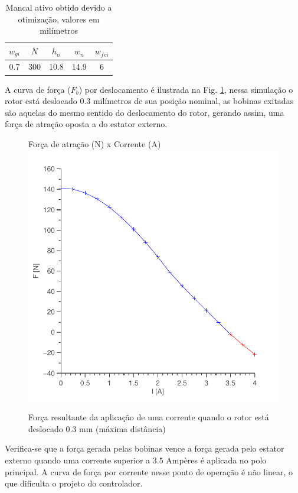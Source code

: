 \begin{table}[ht!]
	\centering
	\begin{tabular}{c c c c c}
		 $w_{gi}$ 	& $N$ & $h_n$ & $w_n$ & $w_{fei}$  \\ \hline \hline
		 0.7		& 300  	& 10.8 	& 14.9	& 6
	\end{tabular} 
	\caption{Mancal ativo obtido devido a otimização, valores em milímetros}
	\label{tab:ativo:resultado} 
\end{table}

A curva de força ($F_b$) por deslocamento é ilustrada na Fig. \ref{ativo_otimizado_fem_I_dx03}, nessa simulação o rotor está deslocado 0.3 milímetros de sua posição nominal, as bobinas exitadas são aquelas do mesmo sentido do deslocamento do rotor, gerando assim, uma força de atração oposta a do estator externo.  

\begin{figure}[ht!]
\centering
Força de atração (N) x Corrente (A)
\includegraphics[width=0.8\linewidth]{Figs/Simulacoes/Ativo/ativo_otimizado_fem_I_dx03}
\caption{Força resultante da aplicação de uma corrente quando o rotor está deslocado 0.3 mm (máxima distância)}
\label{ativo_otimizado_fem_I_dx03}
\end{figure}

Verifica-se que a força gerada pelas bobinas vence a força gerada pelo estator externo quando uma corrente superior a $3.5$ Ampères é aplicada no polo principal. A curva de força por corrente nesse ponto de operação é não linear, o que dificulta o projeto do controlador.


